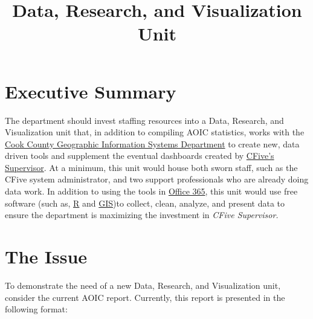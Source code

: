 \documentclass[12pt,]{article}
\title{Data, Research, and Visualization Unit}
\author{}
\date{}
\begin{document}
\maketitle

\hypertarget{executive-summary}{%
\section{Executive Summary}\label{executive-summary}}

The department should invest staffing resources into a Data, Research,
and Visualization unit that, in addition to compiling AOIC statistics,
works with the
\href{https://www.cookcountyil.gov/agency/geographic-information-systems-gis-0}{Cook
County Geographic Information Systems Department} to create new, data
driven tools and supplement the eventual dashboards created by
\href{https://www.cfive.com/products/supervisor/}{CFive's Supervisor}.
At a minimum, this unit would house both sworn staff, such as the CFive
system administrator, and two support professionals who are already
doing data work. In addition to using the tools in
\href{https://products.office.com/en-us/business/office}{Office 365},
this unit would use free software (such as,
\href{https://www.r-project.org}{R} and
\href{https://www.esri.com/en-us/what-is-gis/overview}{GIS})to collect,
clean, analyze, and present data to ensure the department is maximizing
the investment in \emph{CFive Supervisor.}

\hypertarget{the-issue}{%
\section{The Issue}\label{the-issue}}

To demonstrate the need of a new Data, Research, and Visualization unit,
consider the current AOIC report. Currently, this report is presented in
the following format:

\begin{table}[!h]

\caption{\label{tab:first_8}First Eight Columns of CFive Supervisor}
\centering
{}
\end{table}
\end{document}
